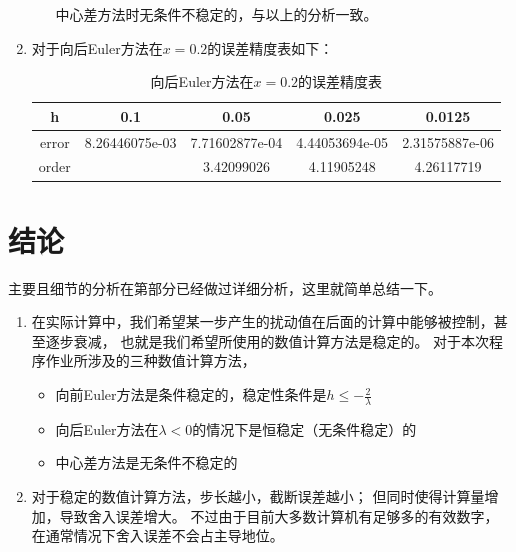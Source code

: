 \documentclass{article}
\begin{document}
\begin{enumerate}
\begin{enumerate}
        中心差方法时无条件不稳定的，与以上的分析一致。
    \end{enumerate}

    \item 对于向后Euler方法在$x=0.2$的误差精度表如下：
    \begin{table}[H]
        \centering
        \caption{向后Euler方法在$x=0.2$的误差精度表}
        \begin{tabular}{ccccc}
            \hline
            h & 0.1 & 0.05 & 0.025 & 0.0125 \\
            \hline
            error & 8.26446075e-03 & 7.71602877e-04 & 4.44053694e-05 & 2.31575887e-06 \\
            \hline
            order & ~ & 3.42099026 & 4.11905248 & 4.26117719 \\
            \hline
        \end{tabular}
    \end{table}
\end{enumerate}

\section{结论}

主要且细节的分析在第部分已经做过详细分析，这里就简单总结一下。
\begin{enumerate}
    \item 在实际计算中，我们希望某一步产生的扰动值在后面的计算中能够被控制，甚至逐步衰减，
    也就是我们希望所使用的数值计算方法是稳定的。
    对于本次程序作业所涉及的三种数值计算方法，
    \begin{itemize}
        \item 向前Euler方法是条件稳定的，稳定性条件是$h \leq -\frac{2}{\lambda}$
        \item 向后Euler方法在$\lambda < 0$的情况下是恒稳定（无条件稳定）的
        \item 中心差方法是无条件不稳定的
    \end{itemize}
    \item 对于稳定的数值计算方法，步长越小，截断误差越小；
    但同时使得计算量增加，导致舍入误差增大。
    不过由于目前大多数计算机有足够多的有效数字，在通常情况下舍入误差不会占主导地位。
\end{enumerate}
\end{document}
